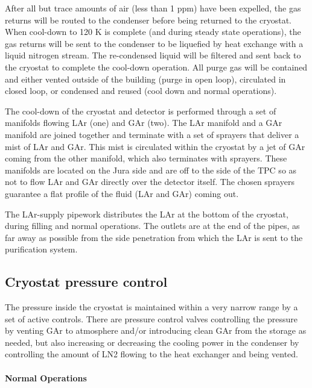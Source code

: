 After all but trace amounts of air (less than 1 ppm) have been expelled, the gas returns will be routed to the condenser before being returned to the cryostat. When cool-down to 120 K is complete (and during steady state operations), the gas returns will be sent to the condenser to be liquefied by heat exchange with a liquid nitrogen stream. The re-condensed liquid will be filtered and sent back to the cryostat to complete the cool-down operation. All purge gas will be contained and either vented outside of the building (purge in open loop), circulated in closed loop, or condensed and reused (cool down and normal operations).

The cool-down of the cryostat and detector is performed through a set of manifolds flowing LAr (one) and GAr (two). The LAr manifold and a GAr manifold are joined together and terminate with a set of sprayers that deliver a mist of LAr and GAr. This mist is circulated within the cryostat by a jet of GAr coming from the other manifold, which also terminates with sprayers. These manifolds are located on the Jura side and are off to the side of the TPC so as not to flow LAr and GAr directly over the detector itself. The chosen sprayers guarantee a flat profile of the fluid (LAr and GAr) coming out.

The LAr-supply pipework distributes the LAr at the bottom of the cryostat, during filling and normal operations. The outlets are at the end of the pipes, as far away as possible from the side penetration from which the LAr is sent to the purification system.

\subsection{Cryostat pressure control}

The pressure inside the cryostat is maintained within a very narrow range by a set of active controls. There are pressure control valves controlling the pressure by venting GAr to atmosphere and/or introducing clean GAr from the storage as needed, but also increasing or decreasing the cooling power in the condenser by controlling the amount of LN2 flowing to the heat exchanger and being vented.

\paragraph{Normal Operations}

